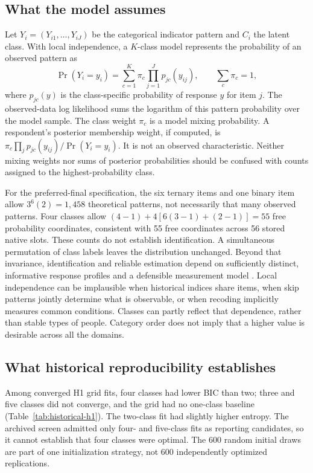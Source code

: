 \subsection{What the model assumes}
Let $Y_i=(Y_{i1},\ldots,Y_{iJ})$ be the categorical indicator pattern and $C_i$ the latent class. With local independence, a $K$-class model represents the probability of an observed pattern as
\[
 \Pr(Y_i=y_i)=\sum_{c=1}^K \pi_c\prod_{j=1}^J p_{jc}(y_{ij}), 
 \qquad \sum_c\pi_c=1,
\]
where $p_{jc}(y)$ is the class-specific probability of response $y$ for item $j$. The observed-data log likelihood sums the logarithm of this pattern probability over the model sample. The class weight $\pi_c$ is a model mixing probability. A respondent's posterior membership weight, if computed, is $\pi_c\prod_j p_{jc}(y_{ij})/\Pr(Y_i=y_i)$. It is not an observed characteristic. Neither mixing weights nor sums of posterior probabilities should be confused with counts assigned to the highest-probability class.

For the preferred-final specification, the six ternary items and one binary item allow $3^6(2)=1{,}458$ theoretical patterns, not necessarily that many observed patterns. Four classes allow $(4-1)+4[6(3-1)+(2-1)]=55$ free probability coordinates, consistent with 55 free coordinates across 56 stored native slots. These counts do not establish identification. A simultaneous permutation of class labels leaves the distribution unchanged. Beyond that invariance, identification and reliable estimation depend on sufficiently distinct, informative response profiles and a defensible measurement model \citep{allmanMatiasRhodes2009}. Local independence can be implausible when historical indices share items, when skip patterns jointly determine what is observable, or when recoding implicitly measures common conditions. Classes can partly reflect that dependence, rather than stable types of people. Category order does not imply that a higher value is desirable across all the domains.

\subsection{What historical reproducibility establishes}
Among converged H1 grid fits, four classes had lower BIC than two; three and five classes did not converge, and the grid had no one-class baseline (Table~\ref{tab:historical-h1}). The two-class fit had slightly higher entropy. The archived screen admitted only four- and five-class fits as reporting candidates, so it cannot establish that four classes were optimal. The 600 random initial draws are part of one initialization strategy, not 600 independently optimized replications.

